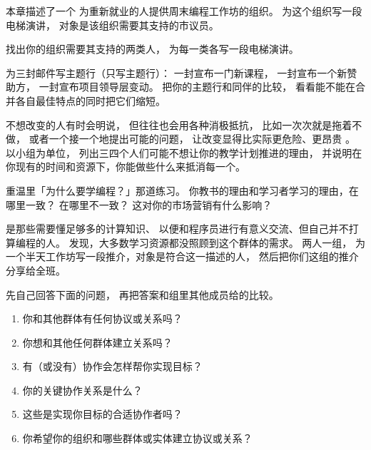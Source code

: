 

本章描述了一个
为重新就业的人提供周末编程工作坊的组织。
为这个组织写一段电梯演讲，
对象是该组织需要其支持的市议员。


找出你的组织需要其支持的两类人，
为每一类各写一段电梯演讲。


为三封邮件写主题行（只写主题行）：
一封宣布一门新课程，
一封宣布一个新赞助方，
一封宣布项目领导层变动。
把你的主题行和同伴的比较，
看看能不能在合并各自最佳特点的同时把它们缩短。


不想改变的人有时会明说，
但往往也会用各种消极抵抗，
比如一次次就是拖着不做，
或者一个接一个地提出可能的问题，
让改变显得比实际更危险、更昂贵
\cite{Scot1987}。
以小组为单位，
列出三四个人们可能不想让你的教学计划推进的理由，
并说明在你现有的时间和资源下，你能做些什么来抵消每一个。


重温里「为什么要学编程？」那道练习。
你教书的理由和学习者学习的理由，在哪里一致？
在哪里不一致？
这对你的市场营销有什么影响？


是那些需要懂足够多的计算知识、
以便和程序员进行有意义交流、但自己并不打算编程的人。
\cite{Wang2018}发现，大多数学习资源都没照顾到这个群体的需求。
两人一组，
为一个半天工作坊写一段推介，对象是符合这一描述的人，
然后把你们这组的推介分享给全班。


先自己回答下面的问题，
再把答案和组里其他成员给的比较。

\begin{enumerate}

\item
  你和其他群体有任何协议或关系吗？

\item
  你想和其他任何群体建立关系吗？

\item
  有（或没有）协作会怎样帮你实现目标？

\item
  你的关键协作关系是什么？

\item
  这些是实现你目标的合适协作者吗？

\item
  你希望你的组织和哪些群体或实体建立协议或关系？

\end{enumerate}

